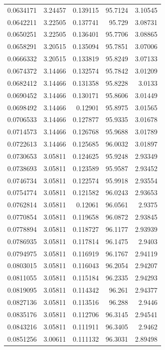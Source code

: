 \begin{tabular}{rrrrr}
0.0634171 & 3.24457 &  0.139115 &  95.7124 & 3.10545 \\
0.0642211 & 3.22505 &  0.137741 &   95.729 & 3.08731 \\
0.0650251 & 3.22505 &  0.136401 &  95.7706 & 3.08865 \\
0.0658291 & 3.20515 &  0.135094 &  95.7851 & 3.07006 \\
0.0666332 & 3.20515 &  0.133819 &  95.8249 & 3.07133 \\
0.0674372 & 3.14466 &  0.132574 &  95.7842 & 3.01209 \\
0.0682412 & 3.14466 &  0.131358 &  95.8228 &  3.0133 \\
0.0690452 & 3.14466 &  0.130171 &  95.8606 & 3.01449 \\
0.0698492 & 3.14466 &   0.12901 &  95.8975 & 3.01565 \\
0.0706533 & 3.14466 &  0.127877 &  95.9335 & 3.01678 \\
0.0714573 & 3.14466 &  0.126768 &  95.9688 & 3.01789 \\
0.0722613 & 3.14466 &  0.125685 &  96.0032 & 3.01897 \\
0.0730653 & 3.05811 &  0.124625 &  95.9248 & 2.93349 \\
0.0738693 & 3.05811 &  0.123589 &  95.9587 & 2.93452 \\
0.0746734 & 3.05811 &  0.122574 &  95.9918 & 2.93554 \\
0.0754774 & 3.05811 &  0.121582 &  96.0243 & 2.93653 \\
0.0762814 & 3.05811 &   0.12061 &  96.0561 &  2.9375 \\
0.0770854 & 3.05811 &  0.119658 &  96.0872 & 2.93845 \\
0.0778894 & 3.05811 &  0.118727 &  96.1177 & 2.93939 \\
0.0786935 & 3.05811 &  0.117814 &  96.1475 &  2.9403 \\
0.0794975 & 3.05811 &  0.116919 &  96.1767 & 2.94119 \\
0.0803015 & 3.05811 &  0.116043 &  96.2054 & 2.94207 \\
0.0811055 & 3.05811 &  0.115184 &  96.2335 & 2.94293 \\
0.0819095 & 3.05811 &  0.114342 &   96.261 & 2.94377 \\
0.0827136 & 3.05811 &  0.113516 &   96.288 &  2.9446 \\
0.0835176 & 3.05811 &  0.112706 &  96.3145 & 2.94541 \\
0.0843216 & 3.05811 &  0.111911 &  96.3405 &  2.9462 \\
0.0851256 & 3.00611 &  0.111132 &  96.3031 & 2.89498 \\

\end{tabular}
